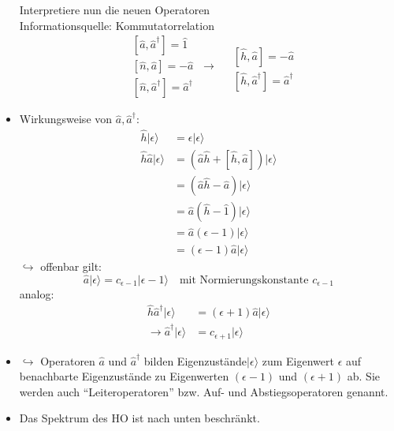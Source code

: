 \documentclass[10pt,article,colorback,accentcolor=tud9d]{scrartcl}
\begin{document}
\begin{itemize}
    Interpretiere nun die neuen Operatoren\\
    Informationsquelle: Kommutatorrelation
    \begin{equation}
    \begin{aligned}
    &[\hat{a},\hat{a}^\dagger]=\hat{1}\\
    &[\hat{n},\hat{a}]=-\hat{a}\\
    &[\hat{n},\hat{a}^\dagger]=\hat{a}^\dagger
    \end{aligned}
    \ \rightarrow\
    \begin{aligned}
    &\\
    &[\hat{h},\hat{a}]=-\hat{a}\\
    &[\hat{h},\hat{a}^\dagger]=\hat{a}^\dagger
    \end{aligned}
    \end{equation}
  \item Wirkungsweise von $\hat{a},\hat{a}^\dagger$: 
    \begin{align}
    \hat{h}|\epsilon\rangle&=\epsilon|\epsilon\rangle\\
    \hat{h}\hat{a}|\epsilon\rangle&=(\hat{a}\hat{h}+[\hat{h},\hat{a}])|\epsilon\rangle\\
    &=(\hat{a}\hat{h}-\hat{a})|\epsilon\rangle\\
    &=\hat{a}(\hat{h}-\hat{1})|\epsilon\rangle\\
    &=\hat{a}(\epsilon-1)|\epsilon\rangle\\
    &=(\epsilon -1)\hat{a}|\epsilon\rangle
    \end{align}
    $\hookrightarrow$ offenbar gilt:
    \begin{equation}
    \hat{a}|\epsilon\rangle=c_{\epsilon-1}|\epsilon-1\rangle \quad \text{mit Normierungskonstante $c_{\epsilon-1}$}
    \end{equation}
    analog:
    \begin{align}
    \hat{h}\hat{a}^\dagger|\epsilon\rangle&=(\epsilon+1)\hat{a}|\epsilon\rangle\\
    \rightarrow \hat{a}^\dagger|\epsilon\rangle&=c_{\epsilon+1}|\epsilon\rangle
    \end{align}
  \item $\hookrightarrow$ Operatoren $\hat{a}$ und $\hat{a}^\dagger$ bilden Eigenzustände$|\epsilon\rangle$ zum Eigenwert $\epsilon$ auf benachbarte Eigenzustände zu Eigenwerten $(\epsilon-1)$ und $(\epsilon+1)$ ab. Sie werden auch "`Leiteroperatoren"' bzw. Auf- und Abstiegsoperatoren genannt.
  \item Das Spektrum des HO ist nach unten beschränkt.\\

\end{itemize}
\end{document}
